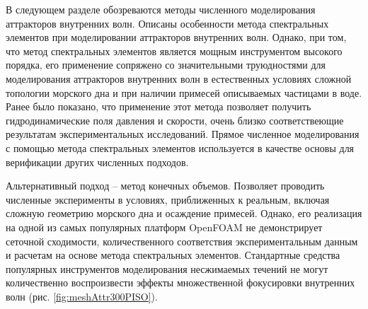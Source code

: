 \documentclass[utf8x]{G7-32} %
\begin{document}
В следующем разделе обозреваются методы численного моделирования аттракторов внутренних волн. 
Описаны особенности метода спектральных элементов при моделировании аттракторов внутренних волн. 
Однако, при том, что метод спектральных элементов является мощным инструментом высокого порядка, 
его применение сопряжено со значительными труюдностями для моделирования аттракторов внутренних волн в естественных условиях сложной топологии морского дна и при наличии примесей описываемых частицами в воде. Ранее было показано, что применение этот метода позволяет получить гидродинамические поля давления и скорости, очень близко соответствеющие результатам экспериментальных исследований. Прямое численное моделирования с помощью метода спектральных элементов используется в качестве основы для верификации других численных подходов.

Альтернативный подход -- метод конечных объемов. Позволяет проводить численные эксперименты в условиях, приближенных к реальным, включая сложную геометрию морского дна и осаждение примесей. Однако, его реализация на одной из самых популярных платформ OpenFOAM не демонстрирует сеточной сходимости, количественного соответствия экспериментальным данным и расчетам на основе метода спектральных элементов. 
Стандартные средства популярных инструментов моделирования несжимаемых течений не могут количественно воспроизвести эффекты множественной фокусировки внутренних волн (рис. \ref{fig:meshAttr300PISO}).
\end{document}
